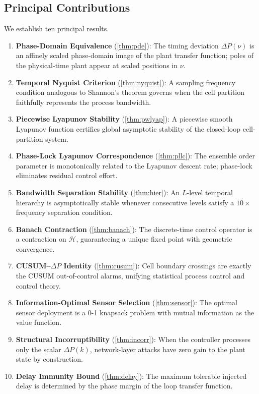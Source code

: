 \documentclass[10pt,twocolumn]{article}
\theoremstyle{plain}
\theoremstyle{definition}
\theoremstyle{remark}
\newcommand{\Hcal}{\mathcal{H}}
\newcommand{\DeltaP}{\Delta P}
\begin{document}
\subsection*{Principal Contributions}

We establish ten principal results.

\begin{enumerate}
  \item \textbf{Phase-Domain Equivalence} (\cref{thm:pde}):
        The timing deviation $\DeltaP(\nu)$ is an affinely scaled
        phase-domain image of the plant transfer function; poles of the
        physical-time plant appear at scaled positions in $\nu$.

  \item \textbf{Temporal Nyquist Criterion} (\cref{thm:nyquist}):
        A sampling frequency condition analogous to Shannon's theorem
        governs when the cell partition faithfully represents the
        process bandwidth.

  \item \textbf{Piecewise Lyapunov Stability} (\cref{thm:pwlyap}):
        A piecewise smooth Lyapunov function certifies global
        asymptotic stability of the closed-loop cell-partition system.

  \item \textbf{Phase-Lock Lyapunov Correspondence} (\cref{thm:pllc}):
        The ensemble order parameter is monotonically related to the
        Lyapunov descent rate; phase-lock eliminates residual control
        effort.

  \item \textbf{Bandwidth Separation Stability} (\cref{thm:hier}):
        An $L$-level temporal hierarchy is asymptotically stable
        whenever consecutive levels satisfy a $10\times$ frequency
        separation condition.

  \item \textbf{Banach Contraction} (\cref{thm:banach}):
        The discrete-time control operator is a contraction on $\Hcal$,
        guaranteeing a unique fixed point with geometric convergence.

  \item \textbf{CUSUM--$\DeltaP$ Identity} (\cref{thm:cusum}):
        Cell boundary crossings are exactly the CUSUM out-of-control
        alarms, unifying statistical process control and control theory.

  \item \textbf{Information-Optimal Sensor Selection} (\cref{thm:sensor}):
        The optimal sensor deployment is a 0-1 knapsack problem with
        mutual information as the value function.

  \item \textbf{Structural Incorruptibility} (\cref{thm:incorr}):
        When the controller processes only the scalar $\DeltaP(k)$,
        network-layer attacks have zero gain to the plant state by
        construction.

  \item \textbf{Delay Immunity Bound} (\cref{thm:delay}):
        The maximum tolerable injected delay is determined by the
        phase margin of the loop transfer function.
\end{enumerate}
\end{document}
